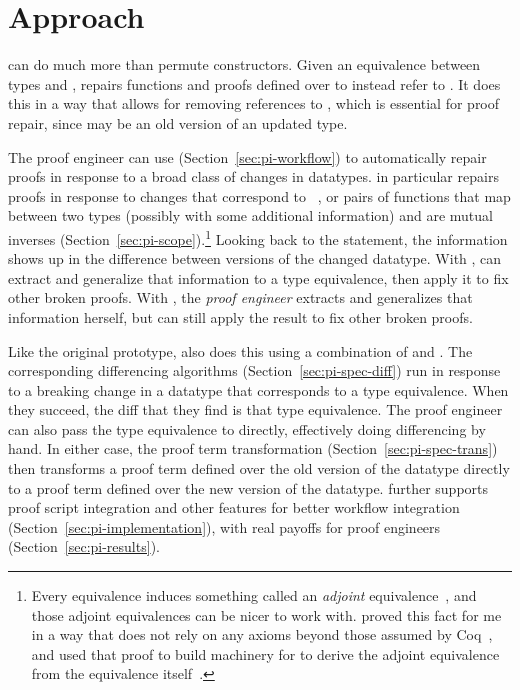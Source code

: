 \section{Approach}
\label{sec:pi-approach}


\toolnamec can do much more than permute constructors.
Given an equivalence between types \Aa and \B,
\toolnamec repairs functions and proofs defined over \Aa to instead refer to \B.
It does this in a way that allows for removing references to \Aa, which is essential for proof repair,
since \Aa may be an old version of an updated type.

The proof engineer can use \toolnamec (Section~\ref{sec:pi-workflow}) to automatically repair proofs in response to a broad class of changes in datatypes.
\toolnamec in particular repairs proofs in response to changes that correspond to ~\cite{univalent2013homotopy},
or pairs of functions that map between two types (possibly with some additional information) and are mutual 
inverses (Section~\ref{sec:pi-scope}).\footnote{Every equivalence induces something called an \textit{adjoint} equivalence~\cite{univalent2013homotopy},
and those adjoint equivalences can be nicer to work with.
 proved this fact for me in a way that does not rely on any axioms beyond those assumed by Coq~\href{https://github.com/uwplse/pumpkin-pi/blob/v2.0.0/plugin/theories/Adjoint.v}{},
and  used that proof to build machinery for \toolnamec to derive the adjoint equivalence from the equivalence itself~\href{https://github.com/uwplse/pumpkin-pi/blob/v2.0.0/plugin/src/automation/search/equivalence.ml}{}.}
Looking back to the  statement, the information shows up in the difference between versions of the changed datatype.
With , \toolnamec can extract and generalize that information to a type equivalence, then apply it to fix other broken proofs.
With , the \textit{proof engineer} extracts and generalizes that information herself, but \toolnamec can still apply the result
to fix other broken proofs.

Like the original  prototype, \toolnamec also does this using a combination of  and .
The corresponding differencing algorithms (Section~\ref{sec:pi-spec-diff}) run in response to a breaking change in a datatype that corresponds to a type equivalence.
When they succeed, the diff that they find is that type equivalence.
The proof engineer can also pass the type equivalence to \toolnamec directly, effectively doing differencing by hand.
In either case, the proof term transformation (Section~\ref{sec:pi-spec-trans}) then transforms a proof term defined over the old version of the datatype
directly to a proof term defined over the new version of the datatype.
\toolnamec further supports proof script integration and other features for better workflow integration (Section~\ref{sec:pi-implementation}),
with real payoffs for proof engineers (Section~\ref{sec:pi-results}).

